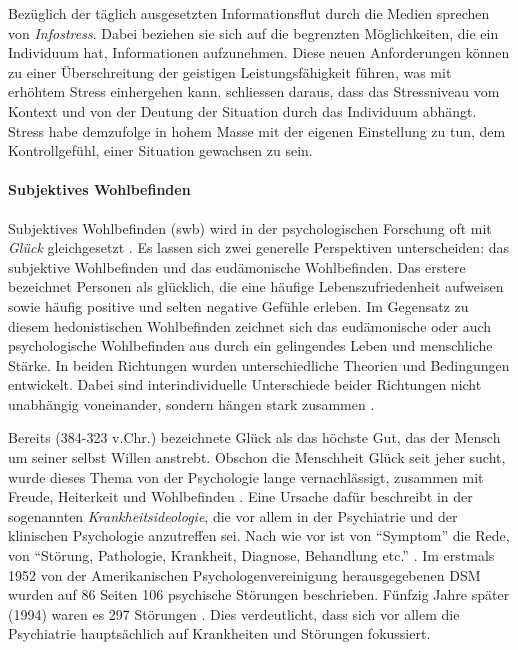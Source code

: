 Bezüglich der täglich ausgesetzten Informationsflut durch die Medien sprechen  von \textit{Infostress}. Dabei beziehen sie sich auf die begrenzten Möglichkeiten, die ein Individuum hat, Informationen aufzunehmen. Diese neuen Anforderungen können zu einer Überschreitung der geistigen Leistungsfähigkeit führen, was mit erhöhtem Stress einhergehen kann.  schliessen daraus, dass das Stressniveau vom Kontext und von der Deutung der Situation durch das Individuum abhängt. Stress habe demzufolge in hohem Masse mit der eigenen Einstellung zu tun, dem Kontrollgefühl, einer Situation gewachsen zu sein.

\paragraph{Subjektives Wohlbefinden}\label{sec:Swb}
Subjektives Wohlbefinden (\acrshort{swb}) wird in der psychologischen Forschung oft mit \textit{Glück} gleichgesetzt \cite{Eid2014}. Es lassen sich zwei generelle Perspektiven unterscheiden: das subjektive Wohlbefinden und das eudämonische Wohlbefinden. Das erstere bezeichnet Personen als glücklich, die eine häufige Lebenszufriedenheit aufweisen sowie häufig positive und selten negative Gefühle erleben. Im Gegensatz zu diesem hedonistischen Wohlbefinden zeichnet sich das eudämonische oder auch psychologische Wohlbefinden aus durch ein gelingendes Leben und menschliche Stärke. In beiden Richtungen wurden unterschiedliche Theorien und Bedingungen entwickelt. Dabei sind interindividuelle Unterschiede beider Richtungen nicht unabhängig voneinander, sondern hängen stark zusammen \cite{Eid2014}.

Bereits  (384-323 v.Chr.) bezeichnete Glück als das höchste Gut, das der Mensch um seiner selbst Willen anstrebt. Obschon die Menschheit Glück seit jeher sucht, wurde dieses Thema von der Psychologie lange vernachlässigt, zusammen mit Freude, Heiterkeit und Wohlbefinden \nohyphens{\cite{Tugade2014, Gruber2014}}. Eine Ursache dafür beschreibt  in der sogenannten \textit{Krankheitsideologie}, die vor allem in der Psychiatrie und der klinischen Psychologie anzutreffen sei. Nach wie vor ist von \enquote{Symptom} die Rede, von \enquote{Störung, Pathologie, Krankheit, Diagnose, Behandlung etc.} \cite[S.~14]{Maddux2005}. Im erstmals 1952 von der Amerikanischen Psychologenvereinigung herausgegebenen DSM wurden auf 86 Seiten 106 psychische Störungen beschrieben. Fünfzig Jahre später (1994) waren es 297 Störungen \cite{Bucher2009}. Dies verdeutlicht, dass sich vor allem die Psychiatrie hauptsächlich auf Krankheiten und Störungen fokussiert.

